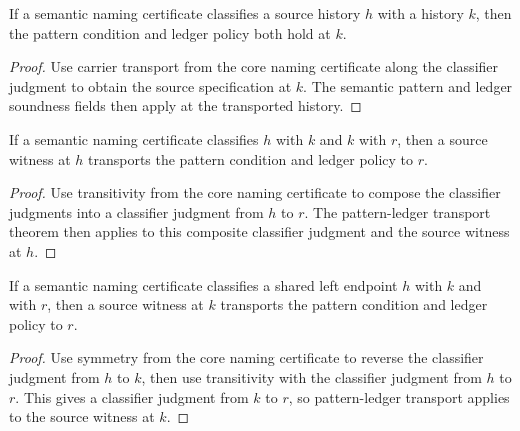 \begin{theorem}
\label{thm:semantic-namecert-pattern-ledger-transport}
If a semantic naming certificate classifies a source history \(h\) with a
history \(k\), then the pattern condition and ledger policy both hold at \(k\).
\end{theorem}
\begin{proof}
Use carrier transport from the core naming certificate along the classifier
judgment to obtain the source specification at \(k\). The semantic pattern and
ledger soundness fields then apply at the transported history.
\end{proof}

\begin{theorem}
\label{thm:semantic-namecert-classifier-chain-transport}
If a semantic naming certificate classifies $h$ with $k$ and $k$ with $r$, then
a source witness at $h$ transports the pattern condition and ledger policy to
$r$.
\end{theorem}
\begin{proof}
Use transitivity from the core naming certificate to compose the classifier
judgments into a classifier judgment from $h$ to $r$. The pattern-ledger
transport theorem then applies to this composite classifier judgment and the
source witness at $h$.
\end{proof}

\begin{theorem}
\label{thm:semantic-namecert-classifier-left-confluence-transport}
If a semantic naming certificate classifies a shared left endpoint $h$ with
$k$ and with $r$, then a source witness at $k$ transports the pattern condition
and ledger policy to $r$.
\end{theorem}
\begin{proof}
Use symmetry from the core naming certificate to reverse the classifier
judgment from $h$ to $k$, then use transitivity with the classifier judgment
from $h$ to $r$. This gives a classifier judgment from $k$ to $r$, so
pattern-ledger transport applies to the source witness at $k$.
\end{proof}

